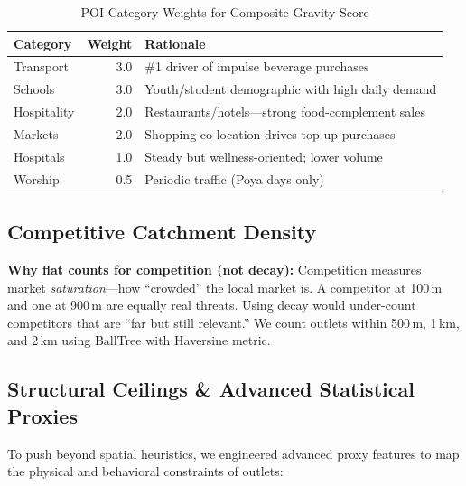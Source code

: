 \documentclass[10.75pt, a4paper]{article}
\begin{document}
\begin{table}[H]
\centering
\caption{POI Category Weights for Composite Gravity Score}
\begin{tabular}{lrl}
\toprule
\textbf{Category} & \textbf{Weight} & \textbf{Rationale} \\
\midrule
Transport & 3.0 & \#1 driver of impulse beverage purchases \\
Schools & 3.0 & Youth/student demographic with high daily demand \\
Hospitality & 2.0 & Restaurants/hotels---strong food-complement sales \\
Markets & 2.0 & Shopping co-location drives top-up purchases \\
Hospitals & 1.0 & Steady but wellness-oriented; lower volume \\
Worship & 0.5 & Periodic traffic (Poya days only) \\
\bottomrule
\end{tabular}
\end{table}

\subsection{Competitive Catchment Density}


\textbf{Why flat counts for competition (not decay):} Competition measures market \textit{saturation}---how ``crowded'' the local market is. A competitor at 100\,m and one at 900\,m are equally real threats. Using decay would under-count competitors that are ``far but still relevant.'' We count outlets within 500\,m, 1\,km, and 2\,km using BallTree with Haversine metric.

\subsection{Structural Ceilings \& Advanced Statistical Proxies}

To push beyond spatial heuristics, we engineered advanced proxy features to map the physical and behavioral constraints of outlets:
\end{document}
